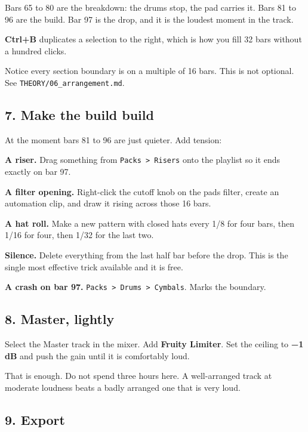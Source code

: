 Bars 65 to 80 are the breakdown: the drums stop, the pad carries it. Bars 81 to 96 are the
build. Bar 97 is the drop, and it is the loudest moment in the track.

\textbf{Ctrl+B} duplicates a selection to the right, which is how you fill 32 bars without a
hundred clicks.

Notice every section boundary is on a multiple of 16 bars. This is not optional. See
\texttt{THEORY/06\_arrangement.md}.

\subsection{7. Make the build build}\label{fl03_first_track-7-make-the-build-build}

At the moment bars 81 to 96 are just quieter. Add tension:

\textbf{A riser.} Drag something from \texttt{Packs\ \textgreater{}\ Risers} onto the playlist so it ends exactly on
bar 97.

\textbf{A filter opening.} Right-click the cutoff knob on the pad\textquotesingle s filter, create an automation
clip, and draw it rising across those 16 bars.

\textbf{A hat roll.} Make a new pattern with closed hats every 1/8 for four bars, then 1/16 for
four, then 1/32 for the last two.

\textbf{Silence.} Delete everything from the last half bar before the drop. This is the single
most effective trick available and it is free.

\textbf{A crash on bar 97.} \texttt{Packs\ \textgreater{}\ Drums\ \textgreater{}\ Cymbals}. Marks the boundary.

\subsection{8. Master, lightly}\label{fl03_first_track-8-master-lightly}

Select the Master track in the mixer. Add \textbf{Fruity Limiter}. Set the ceiling to \textbf{−1 dB}
and push the gain until it is comfortably loud.

That is enough. Do not spend three hours here. A well-arranged track at moderate loudness
beats a badly arranged one that is very loud.

\subsection{9. Export}\label{fl03_first_track-9-export}

